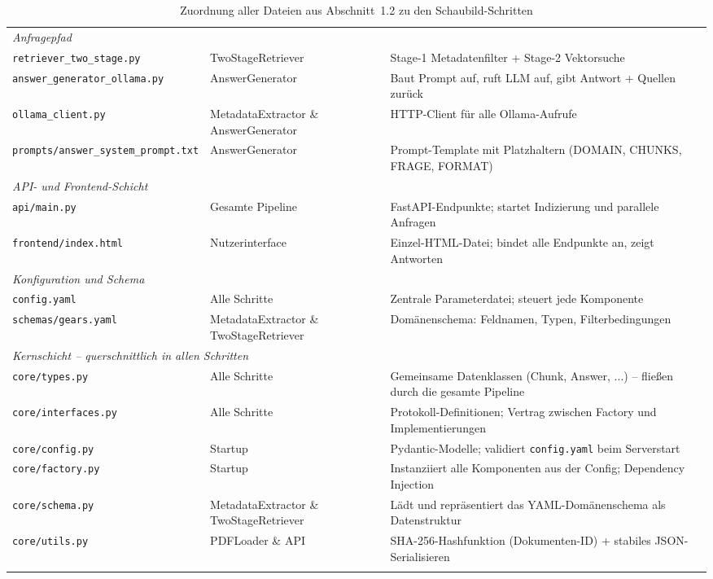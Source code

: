 \documentclass[12pt, a4paper]{article}
\begin{document}
\begin{longtable}{p{5.2cm} p{3.5cm} p{5.5cm}}
\multicolumn{3}{l}{\textit{\small Anfragepfad}} \\[2pt]
\texttt{retriever\_two\_stage.py}    & TwoStageRetriever    & Stage-1 Metadatenfilter + Stage-2 Vektorsuche \\[3pt]
\texttt{answer\_generator\_ollama.py} & AnswerGenerator     & Baut Prompt auf, ruft LLM auf, gibt Antwort + Quellen zurück \\[3pt]
\texttt{ollama\_client.py}           & MetadataExtractor \& AnswerGenerator & HTTP-Client für alle Ollama-Aufrufe \\[3pt]
\texttt{prompts/answer\_system\_prompt.txt} & AnswerGenerator & Prompt-Template mit Platzhaltern (DOMAIN, CHUNKS, FRAGE, FORMAT) \\[6pt]

\multicolumn{3}{l}{\textit{\small API- und Frontend-Schicht}} \\[2pt]
\texttt{api/main.py}                 & Gesamte Pipeline     & FastAPI-Endpunkte; startet Indizierung und parallele Anfragen \\[3pt]
\texttt{frontend/index.html}         & Nutzerinterface      & Einzel-HTML-Datei; bindet alle Endpunkte an, zeigt Antworten \\[6pt]

\multicolumn{3}{l}{\textit{\small Konfiguration und Schema}} \\[2pt]
\texttt{config.yaml}                 & Alle Schritte        & Zentrale Parameterdatei; steuert jede Komponente \\[3pt]
\texttt{schemas/gears.yaml}          & MetadataExtractor \& TwoStageRetriever & Domänenschema: Feldnamen, Typen, Filterbedingungen \\[6pt]

\multicolumn{3}{l}{\textit{\small Kernschicht -- querschnittlich in allen Schritten}} \\[2pt]
\texttt{core/types.py}               & Alle Schritte        & Gemeinsame Datenklassen (Chunk, Answer, ...) -- fließen durch die gesamte Pipeline \\[3pt]
\texttt{core/interfaces.py}          & Alle Schritte        & Protokoll-Definitionen; Vertrag zwischen Factory und Implementierungen \\[3pt]
\texttt{core/config.py}              & Startup              & Pydantic-Modelle; validiert \texttt{config.yaml} beim Serverstart \\[3pt]
\texttt{core/factory.py}             & Startup              & Instanziiert alle Komponenten aus der Config; Dependency Injection \\[3pt]
\texttt{core/schema.py}              & MetadataExtractor \& TwoStageRetriever & Lädt und repräsentiert das YAML-Domänenschema als Datenstruktur \\[3pt]
\texttt{core/utils.py}               & PDFLoader \& API     & SHA-256-Hashfunktion (Dokumenten-ID) + stabiles JSON-Serialisieren \\

\bottomrule
\caption{Zuordnung aller Dateien aus Abschnitt~1.2 zu den Schaubild-Schritten}
\end{longtable}
\end{document}
